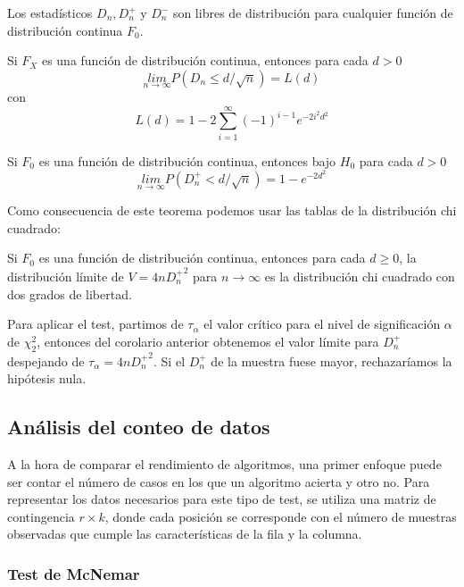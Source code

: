 \begin{teorema}
	Los estadísticos $D_n, D_n^+$ y $D_n^-$ son libres de 
distribución para cualquier función de distribución continua
$F_0$.
\end{teorema}
	
\begin{teorema}
	Si $F_X$ es una función de distribución continua, 
entonces para cada $d>0$
	\[ \underset{n \rightarrow \infty}{lim}
			P(D_n \leq d/\sqrt{n}) = L(d) \]
	con
	\[ L(d) = 1 - 2 \sum\limits_{i=1}^\infty 
			(-1)^{i-1} e^{-2i^2d^2}	\]
\end{teorema}

\begin{teorema}
	Si $F_0$ es una función de distribución continua, 
entonces bajo $H_0$ para cada $d>0$
	\[ \underset{n \rightarrow \infty}{lim}
			P(D_n^+ < d/\sqrt{n}) = 1-e^{-2d^2} \]
\end{teorema}	
	Como consecuencia de este teorema podemos usar las tablas
de la distribución chi cuadrado:
	
\begin{corolario}
	Si $F_0$ es una función de distribución continua, 
entonces para cada $d \geq 0$, la distribución límite de 
$V = 4n {D_n^+}^2$ para $n \rightarrow \infty$ es la 
distribución chi cuadrado con dos grados de libertad.
\end{corolario}	
	
	Para aplicar el test, partimos de $\tau_\alpha$ el valor
crítico para el nivel de significación $\alpha$ de 
$\chi^2_2$, entonces del corolario anterior obtenemos el 
valor límite para $D^+_n$ despejando de $\tau_\alpha
= 4n {D_n^+}^2$. Si el $D^+_n$ de la muestra fuese mayor,
rechazaríamos la hipótesis nula.
	
\subsection{Análisis del conteo de datos}
	
	A la hora de comparar el rendimiento de algoritmos, una 
primer enfoque puede ser contar el número de casos en los que 
un algoritmo acierta y otro no. Para representar los datos 
necesarios para este tipo de test, se utiliza una matriz de 
contingencia $r \times k$, donde cada posición se corresponde 
con el número de muestras observadas que cumple las 
características de la fila y la columna.
	
\subsubsection{Test de McNemar}
	
